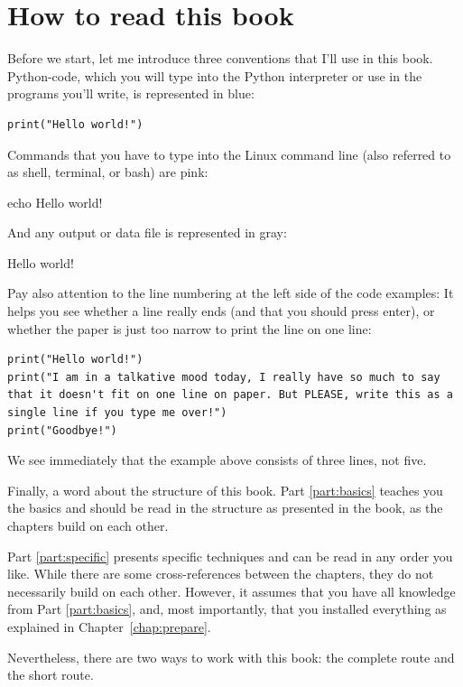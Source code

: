 \documentclass[a4paper,12pt]{book}
\begin{document}
\chapter{How to read this book}
\label{howtoread}

Before we start, let me introduce three conventions that I'll use in this book. Python-code, which you will type into the Python interpreter or use in the programs you'll write, is represented in blue:
\begin{lstlisting}
print("Hello world!")
\end{lstlisting}
Commands that you have to type into the Linux command line (also referred to as shell, terminal, or bash) are pink:
\begin{lstlistingbash}
echo Hello world!
\end{lstlistingbash}
And any output or data file is represented in gray:
\begin{lstlistingoutput}
Hello world!
\end{lstlistingoutput}

Pay also attention to the line numbering at the left side of the code examples: It helps you see whether a line really ends (and that you should press enter), or whether the paper is just too narrow to print the line on one line:

\begin{lstlisting}
print("Hello world!")
print("I am in a talkative mood today, I really have so much to say that it doesn't fit on one line on paper. But PLEASE, write this as a single line if you type me over!")
print("Goodbye!")
\end{lstlisting}

We see immediately that the example above consists of three lines, not five.

Finally, a word about the structure of this book. Part \ref{part:basics} teaches you the basics and should be read in the structure as presented in the book, as the chapters build on each other. 

Part \ref{part:specific} presents specific techniques and can be read in any order you like. While there are some cross-references between the chapters, they do not necessarily build on each other. However, it assumes that you have all knowledge from Part \ref{part:basics}, and, most importantly, that you installed everything as explained in Chapter~\ref{chap:prepare}.

Nevertheless, there are two ways to work with this book: the complete route and the short route.
\end{document}

